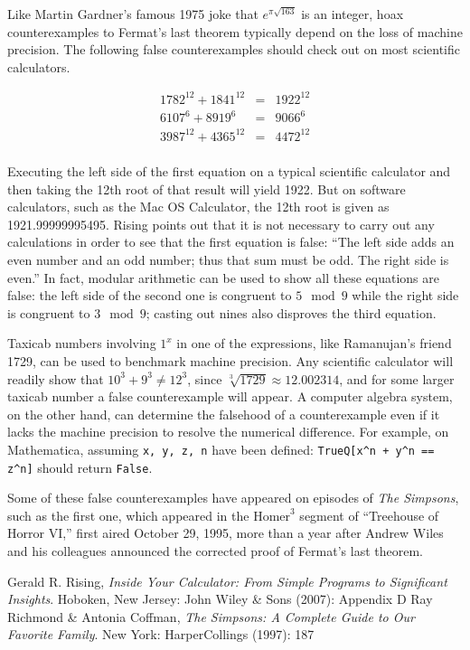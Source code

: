 \documentclass[12pt]{article}
\begin{document}
Like Martin Gardner's famous 1975 joke that $e^{\pi \sqrt{163}}$ is an integer, hoax counterexamples to Fermat's last theorem typically depend on the loss of machine precision. The following false counterexamples should check out on most scientific calculators.

\begin{eqnarray*}
1782^{12} + 1841^{12} & = & 1922^{12} \\
6107^6 + 8919^6 & = & 9066^6 \\
3987^{12} + 4365^{12} & = & 4472^{12} \\
\end{eqnarray*}

Executing the left side of the first equation on a typical scientific calculator and then taking the 12th root of that result will yield 1922. But on software calculators, such as the Mac OS Calculator, the 12th root is given as 1921.99999995495. Rising points out that it is not necessary to carry out any calculations in order to see that the first equation is false: ``The left side adds an even number and an odd number; thus that sum must be odd. The right side is even.'' In fact, modular arithmetic can be used to show all these equations are false: the left side of the second one is congruent to $5 \mod 9$ while the right side is congruent to $3 \mod 9$; casting out nines also disproves the third equation.

Taxicab numbers involving $1^x$ in one of the expressions, like Ramanujan's friend 1729, can be used to benchmark machine precision. Any scientific calculator will readily show that $10^3 + 9^3 \neq 12^3$, since $\sqrt[3]{1729} \approx 12.002314$, and for some larger taxicab number a false counterexample will appear. A computer algebra system, on the other hand, can determine the falsehood of a counterexample even if it lacks the machine precision to resolve the numerical difference. For example, on Mathematica, assuming \verb"x, y, z, n" have been defined: \verb"TrueQ[x^n + y^n == z^n]" should return \verb"False".

Some of these false counterexamples have appeared on episodes of {\it The Simpsons}, such as the first one, which appeared in the $\textrm{Homer}^3$ segment of ``Treehouse of Horror VI,'' first aired October 29, 1995, more than a year after Andrew Wiles and his colleagues announced the corrected proof of Fermat's last theorem.

\begin{thebibliography}{2}
 Gerald R. Rising, {\it Inside Your Calculator: From Simple Programs to Significant Insights}. Hoboken, New Jersey: John Wiley \& Sons (2007): Appendix D
 Ray Richmond \& Antonia Coffman, {\it The Simpsons: A Complete Guide to Our Favorite Family}. New York: HarperCollings (1997): 187
\end{thebibliography}
\end{document}
